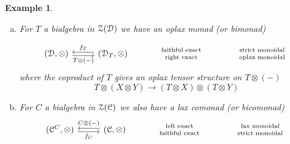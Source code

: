 \documentclass[a4paper, reqno]{amsart}
\newtheorem{example}[theorem]{Example}
\theoremstyle{introTheorems}
\newcommand\cZ{\mathcal{Z}}
\renewcommand{\1}{\mathbbold{1}}
\begin{document}
\begin{example}
\begin{enumerate}[(a)]
\item For $T$ a  bialgebra in $\cZ(\catD)$ we have an oplax monad (or \emph{bimonad})

\[\begin{tikzcd}[row sep=6ex, column sep=6ex]
\renewcommand{\arraystretch}{0.7}
(\catD,\otimes)
\arrow[r, leftarrow, shift right=-2pt,"\forget_T"]
\arrow[r, rightarrow, swap,shift right=2pt,"T\otimes(-)"]
& 
(\catD_T,\otimes)
&
\begin{array}{c}
    \scriptstyle \textnormal{faithful exact}\\
    \scriptstyle \textnormal{right exact} \\
\end{array}
&
\begin{array}{c}
    \scriptstyle \textnormal{strict monoidal}\\
    \scriptstyle \textnormal{oplax monoidal} \\
\end{array}
\end{tikzcd}\]
where the coproduct of $T$ gives an oplax tensor structure on $T\otimes(-)$ \newline
\[T\otimes (X\otimes Y)\to (T\otimes X)\otimes(T\otimes Y)\]

\item For $C$ a bialgebra in $\cZ(\catC)$ we also have a lax comonad  (or \emph{bicomonad})
\[\begin{tikzcd}[row sep=6ex, column sep=6ex]
\renewcommand{\arraystretch}{0.7}
(\catC^C,\otimes)
\arrow[r, rightarrow, swap, shift right=2pt,"\forget_C"]
\arrow[r, leftarrow,shift right=-2pt,"C\otimes(-)"]
& 
(\catC,\otimes)
&
\begin{array}{c}
    \scriptstyle \textnormal{left exact}\\
    \scriptstyle \textnormal{faithful exact} \\
\end{array}
&
\begin{array}{c}
    \scriptstyle \textnormal{lax monoidal}\\
    \scriptstyle \textnormal{strict monoidal} \\
\end{array}
\end{tikzcd}\]
\end{enumerate}
\end{example}
\end{document}
